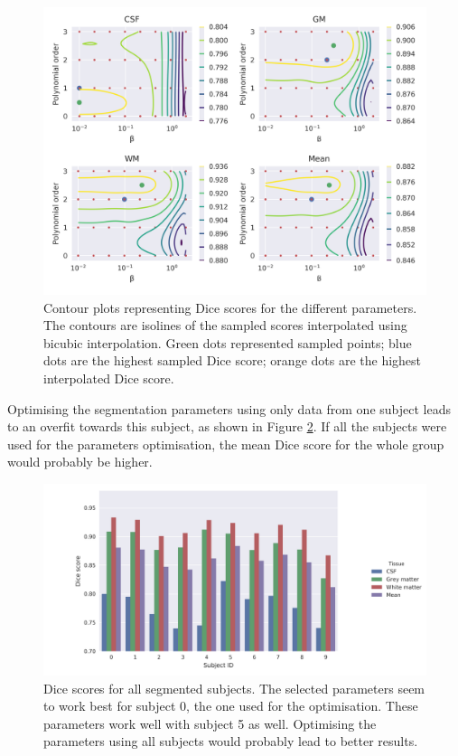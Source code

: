 \begin{figure}
  \centering
  \includegraphics[width=\textwidth]{figures/parameters_dices}
  \caption{Contour plots representing Dice scores for the different parameters. The contours are isolines of the sampled scores interpolated using bicubic interpolation. Green dots represented sampled points; blue dots are the highest sampled Dice score; orange dots are the highest interpolated Dice score.}
  \label{fig:params-optimisation}
\end{figure}



Optimising the segmentation parameters using only data from one subject leads to an overfit towards this subject, as shown in Figure \ref{fig:dices-bars}. If all the subjects were used for the parameters optimisation, the mean Dice score for the whole group would probably be higher.

\begin{figure}
  \centering
  \includegraphics[width=\textwidth]{figures/dices_bars}
  \caption{Dice scores for all segmented subjects. The selected parameters seem to work best for subject 0, the one used for the optimisation. These parameters work well with subject 5 as well. Optimising the parameters using all subjects would probably lead to better results.}
  \label{fig:dices-bars}
\end{figure}
